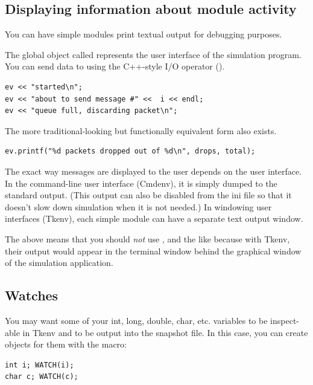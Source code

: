 \subsection{Displaying information about module activity}

You can have simple modules print textual output for
debugging purposes.

The global object called  represents the user interface of the
simulation program. You can send data to  using the
C++-style I/O operator (\ttt{<}\ttt{<}).

\begin{verbatim}
ev << "started\n";
ev << "about to send message #" <<  i << endl;
ev << "queue full, discarding packet\n";
\end{verbatim}

The more traditional-looking but functionally equivalent
 form also exists.

\begin{verbatim}
ev.printf("%d packets dropped out of %d\n", drops, total);
\end{verbatim}

The exact way messages are displayed to the user depends on the user
interface. In the command-line user interface (Cmdenv),
it is simply dumped to the standard output. (This output can also be
disabled from the ini file so that it doesn't slow down simulation
when it is not needed.) In windowing user interfaces
(Tkenv), each simple module can have
a separate text output window.

The above means that you should \textit{not} use ,
 \fname{<<} and the like because with Tkenv, their output
would appear in the terminal window behind the graphical window of the
simulation application.


\subsection{Watches}

You may want some of your int, long, double, char, etc. variables to
be inspect-able in Tkenv and to be output into the snapshot
file. In this case, you can create
 objects for them with the  macro:

\begin{verbatim}
int i; WATCH(i);
char c; WATCH(c);
\end{verbatim}

